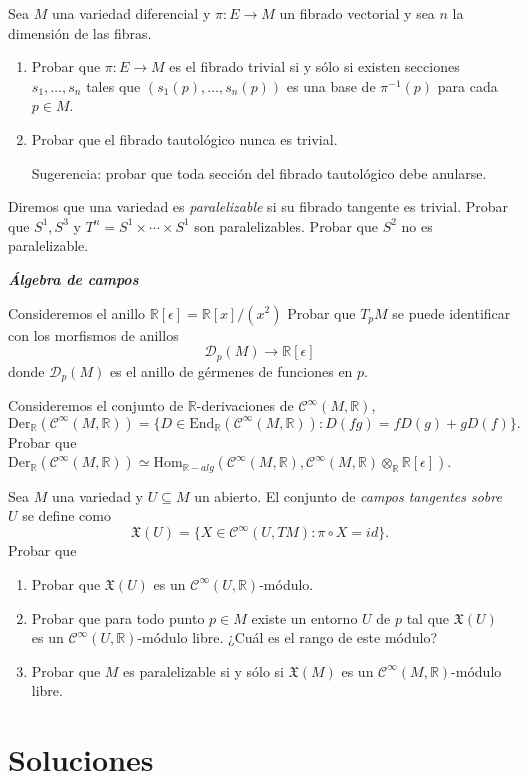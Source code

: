 \documentclass[11pt]{article}
\newcommand{\R}{{\mathbb{R}}}
\numberwithin{theorem}{subsection}
\begin{document}
\begin{question}Sea $M$ una variedad diferencial y $\pi:E\to M$ un fibrado vectorial y sea $n$ la dimensi\'on de las fibras.
	\begin{enumerate}
		\item Probar que $\pi:E\to M$ es el fibrado trivial si y s\'olo si existen secciones $s_1,\ldots,s_n$ tales que $(s_1(p),\ldots,s_n(p))$ es una base de $\pi^{-1}(p)$ para cada $p\in M$.
		
		\item Probar que el fibrado tautol\'ogico nunca es trivial.
		
		\noindent Sugerencia: probar que toda secci\'on del fibrado tautol\'ogico debe anularse.
	\end{enumerate}
\end{question}

\begin{question}
	Diremos que una variedad es \textit{paralelizable} si su fibrado tangente es trivial. Probar que $S^1, S^3$ y $T^n=S^1\times\cdots\times S^1$ son paralelizables. Probar que $S^2$ no es paralelizable.
\end{question}


\textsl{\textbf{\'Algebra de campos}}

\begin{question}
	Consideremos el anillo $\R[\epsilon]=\R[x]/(x^2)$ Probar que $T_p M$ se puede identificar con los morfismos de anillos $$\mathscr{D}_p(M)\to\R[\epsilon]$$ donde $\mathscr{D}_p(M)$ es el anillo de g\'ermenes de funciones en $p$.
\end{question}

\begin{question}
	Consideremos el conjunto de $\R$-derivaciones de $\mathscr{C}^\infty(M,\R)$, $$\mathrm{Der}_\R(\mathscr{C}^\infty(M,\R)) = \{D\in\mathrm{End}_\R(\mathscr{C}^\infty(M,\R)) : D(fg) = fD(g)+gD(f)\}.$$ Probar que $\mathrm{Der}_\R(\mathscr{C}^\infty(M,\R)) \simeq \mathrm{Hom}_{\R-alg}(\mathscr{C}^\infty(M,\R),\mathscr{C}^\infty(M,\R)\otimes_\R \R[\epsilon])$.
\end{question}

\begin{question}
	Sea $M$ una variedad y $U\subseteq M$ un abierto. El conjunto de \textit{campos tangentes sobre $U$} se define como $$\mathfrak{X}(U) = \{X\in\mathscr{C}^\infty(U,TM): \pi\circ X = id\}.$$ Probar que
	\begin{enumerate}
		\item Probar que $\mathfrak{X}(U)$ es un $\mathscr{C}^\infty(U,\R)$-m\'odulo.
		\item Probar que para todo punto $p\in M$ existe un entorno $U$ de $p$ tal que $\mathfrak{X}(U)$ es un $\mathscr{C}^\infty(U,\R)$-m\'odulo libre. ¿Cu\'al es el rango de este m\'odulo?
		\item Probar que $M$ es paralelizable si y s\'olo si $\mathfrak{X}(M)$ es un $\mathscr{C}^\infty(M,\R)$-m\'odulo libre.
	\end{enumerate}
\end{question}

\section{Soluciones}

\printsolutions
\end{document}

